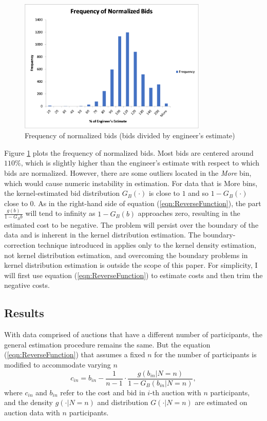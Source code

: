 \documentclass[11pt]{article}
\begin{document}
\begin{figure}
    \includegraphics[width=0.8\textwidth]{BidFrequency.png}
    \centering
    \caption{Frequency of normalized bids (bids divided by engineer's estimate)}
    \label{fig:BidFrequency}
\end{figure}

Figure \ref{fig:BidFrequency} plots the frequency of normalized bids. Most bids 
are centered around $110\%$, which is slightly higher than the engineer's estimate 
with respect to which bids are normalized.
However, there are some outliers located in the \textit{More} bin, 
which would cause numeric instability in estimation. 
For data that is More bins, the kernel-estimated bid distribution 
$G_B(\cdot)$ is close to $1$ and so $1-G_B(\cdot)$ close to 0. As in 
the right-hand side of equation (\ref{eqn:ReverseFunction}), the 
part $\frac{g(b)}{1-G_B{b}}$ will tend to infinity as $1-G_B(b)$ 
approaches zero, resulting in the estimated cost to be negative. 
The problem will persist over the boundary of the data and is 
inherent in the kernel distribution estimation.
The boundary-correction technique introduced in \cite{HickmanHubbard2015}
applies only to the kernel density estimation, not kernel 
distribution estimation, and overcoming 
the boundary problems in kernel distribution estimation is outside the scope 
of this paper. For simplicity, I will first use equation 
(\ref{eqn:ReverseFunction}) to estimate costs and then trim the negative costs.

\subsection{Results}
With data comprised of auctions that have a different number of participants, 
the general estimation procedure remains the same. But the equation 
(\ref{eqn:ReverseFunction}) that assumes a fixed $n$ for the number 
of participants is modified to 
accommodate varying $n$ \cite{Matthewetal2018}
\begin{equation}
    c_{in} = b_{in} - \frac{1}{n-1} \cdot \frac{g(b_{in}|N = n)}{1-G_{B}(b_{in}|N=n)},
    \label{eqn:ReverseFunction_N}
\end{equation}
where $c_{in}$ and $b_{in}$ refer to the cost and bid in $i$-th auction 
with $n$ participants, and the density $g(\cdot|N=n)$ and distribution
$G(\cdot|N=n)$ are estimated on auction data with $n$ participants. 
\end{document}
